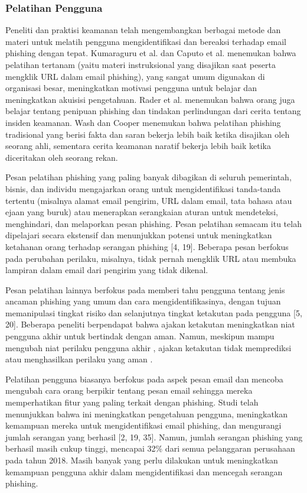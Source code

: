 \documentclass[lettersize,journal]{IEEEtran}
\begin{document}
\subsubsection{Pelatihan Pengguna}
Peneliti dan praktisi keamanan telah mengembangkan berbagai metode dan materi
untuk melatih pengguna mengidentifikasi dan bereaksi terhadap email phishing
dengan tepat. Kumaraguru et al. \cite{satusembilan} dan Caputo et al.
\cite{dua} menemukan bahwa pelatihan tertanam (yaitu materi instruksional yang
disajikan saat peserta mengklik URL dalam email phishing), yang sangat umum
digunakan di organisasi besar, meningkatkan motivasi pengguna untuk belajar dan
meningkatkan akuisisi pengetahuan. Rader et al. \cite{duatujuh} menemukan bahwa
orang juga belajar tentang penipuan phishing dan tindakan perlindungan dari
cerita tentang insiden keamanan. Wash dan Cooper \cite{tigalima} menemukan
bahwa pelatihan phishing tradisional yang berisi fakta dan saran bekerja lebih
baik ketika disajikan oleh seorang ahli, sementara cerita keamanan naratif
bekerja lebih baik ketika diceritakan oleh seorang rekan.

Pesan pelatihan phishing yang paling banyak dibagikan di seluruh pemerintah,
bisnis, dan individu mengajarkan orang untuk mengidentifikasi tanda-tanda
tertentu (misalnya alamat email pengirim, URL dalam email, tata bahasa atau
ejaan yang buruk) atau menerapkan serangkaian aturan untuk mendeteksi,
menghindari, dan melaporkan pesan phishing. Pesan pelatihan semacam itu telah
dipelajari secara ekstensif dan menunjukkan potensi untuk meningkatkan
ketahanan orang terhadap serangan phishing [4, 19]. Beberapa pesan berfokus
pada perubahan perilaku, misalnya, tidak pernah mengklik URL atau membuka
lampiran dalam email dari pengirim yang tidak dikenal.

Pesan pelatihan lainnya berfokus pada memberi tahu pengguna tentang jenis
ancaman phishing yang umum dan cara mengidentifikasinya, dengan tujuan
memanipulasi tingkat risiko dan selanjutnya tingkat ketakutan pada pengguna [5,
    20]. Beberapa peneliti berpendapat bahwa ajakan ketakutan meningkatkan niat
pengguna akhir untuk bertindak dengan aman. Namun, meskipun mampu mengubah niat
perilaku pengguna akhir \cite{lima}, ajakan ketakutan tidak memprediksi atau
menghasilkan perilaku yang aman \cite{enam}.

Pelatihan pengguna biasanya berfokus pada aspek pesan email dan mencoba
mengubah cara orang berpikir tentang pesan email sehingga mereka memperhatikan
fitur yang paling terkait dengan phishing. Studi telah menunjukkan bahwa ini
meningkatkan pengetahuan pengguna, meningkatkan kemampuan mereka untuk
mengidentifikasi email phishing, dan mengurangi jumlah serangan yang berhasil
  [2, 19, 35]. Namun, jumlah serangan phishing yang berhasil masih cukup tinggi,
mencapai 32\% dari semua pelanggaran perusahaan pada tahun 2018. Masih banyak
yang perlu dilakukan untuk meningkatkan kemampuan pengguna akhir dalam
mengidentifikasi dan mencegah serangan phishing.
\end{document}
